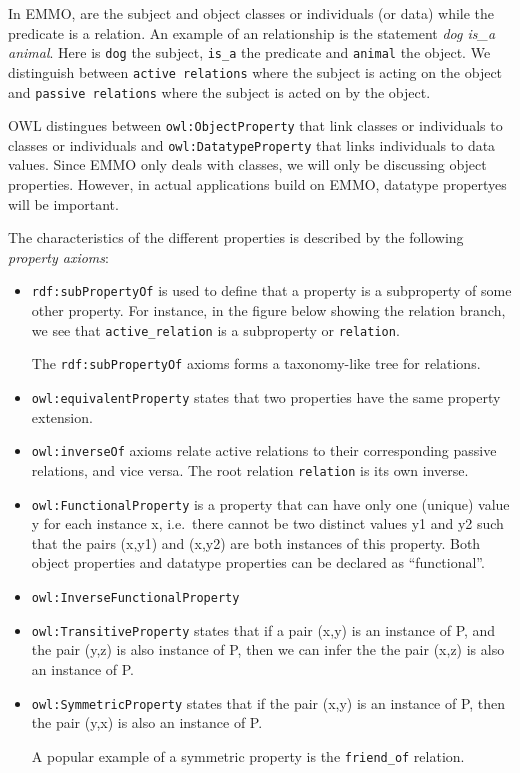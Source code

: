 \documentclass[a4paper,]{report}
\begin{document}
In EMMO, are the subject and object classes or individuals (or data)
while the predicate is a relation. An example of an relationship is the
statement \emph{dog is\_a animal}. Here is \texttt{dog} the subject,
\texttt{is\_a} the predicate and \texttt{animal} the object. We
distinguish between \texttt{active\ relations} where the subject is
acting on the object and \texttt{passive\ relations} where the subject
is acted on by the object.

OWL distingues between \texttt{owl:ObjectProperty} that link classes or
individuals to classes or individuals and \texttt{owl:DatatypeProperty}
that links individuals to data values. Since EMMO only deals with
classes, we will only be discussing object properties. However, in
actual applications build on EMMO, datatype propertyes will be
important.

The characteristics of the different properties is described by the
following \emph{property axioms}:

\begin{itemize}
\item
  \texttt{rdf:subPropertyOf} is used to define that a property is a
  subproperty of some other property. For instance, in the figure below
  showing the relation branch, we see that \texttt{active\_relation} is
  a subproperty or \texttt{relation}.

  The \texttt{rdf:subPropertyOf} axioms forms a taxonomy-like tree for
  relations.
\end{itemize}

\begin{itemize}
\item
  \texttt{owl:equivalentProperty} states that two properties have the
  same property extension.
\item
  \texttt{owl:inverseOf} axioms relate active relations to their
  corresponding passive relations, and vice versa. The root relation
  \texttt{relation} is its own inverse.
\item
  \texttt{owl:FunctionalProperty} is a property that can have only one
  (unique) value y for each instance x, i.e.~there cannot be two
  distinct values y1 and y2 such that the pairs (x,y1) and (x,y2) are
  both instances of this property. Both object properties and datatype
  properties can be declared as ``functional''.
\item
  \texttt{owl:InverseFunctionalProperty}
\item
  \texttt{owl:TransitiveProperty} states that if a pair (x,y) is an
  instance of P, and the pair (y,z) is also instance of P, then we can
  infer the the pair (x,z) is also an instance of P.
\item
  \texttt{owl:SymmetricProperty} states that if the pair (x,y) is an
  instance of P, then the pair (y,x) is also an instance of P.

  A popular example of a symmetric property is the \texttt{friend\_of}
  relation.
\end{itemize}
\end{document}
